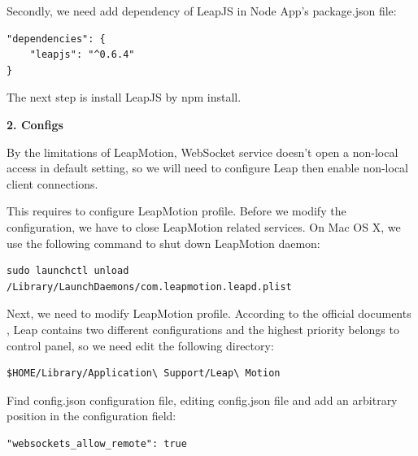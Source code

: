 Secondly, we need add dependency of LeapJS in Node App's package.json file:
\begin{lstlisting}[frame=trBL,frameround=fttt,rulesepcolor=\color{white},numbers=none]
"dependencies": {
    "leapjs": "^0.6.4"
}
\end{lstlisting}

The next step is install LeapJS by npm install.

\textbf{2. Configs}

By the limitations of LeapMotion\cite{Leap:2016}, WebSocket service doesn't open a non-local access in default setting, so we will need to configure Leap then enable non-local client connections.

This requires to configure LeapMotion profile. Before we modify the configuration, we have to close LeapMotion related services. On Mac OS X, we use the following command to shut down LeapMotion daemon:

\begin{lstlisting}[frame=trBL,frameround=fttt,rulesepcolor=\color{white},numbers=none]
sudo launchctl unload /Library/LaunchDaemons/com.leapmotion.leapd.plist
\end{lstlisting}

Next, we need to modify LeapMotion profile. According to the official documents , Leap contains two different configurations and the highest priority belongs to control panel, so we need edit the following directory:

\begin{lstlisting}[frame=trBL,frameround=fttt,rulesepcolor=\color{white},numbers=none]
$HOME/Library/Application\ Support/Leap\ Motion
\end{lstlisting}

Find config.json configuration file, editing config.json file and add an arbitrary position in the configuration field:

\begin{lstlisting}[frame=trBL,frameround=fttt,rulesepcolor=\color{white},numbers=none]
"websockets_allow_remote": true
\end{lstlisting}

